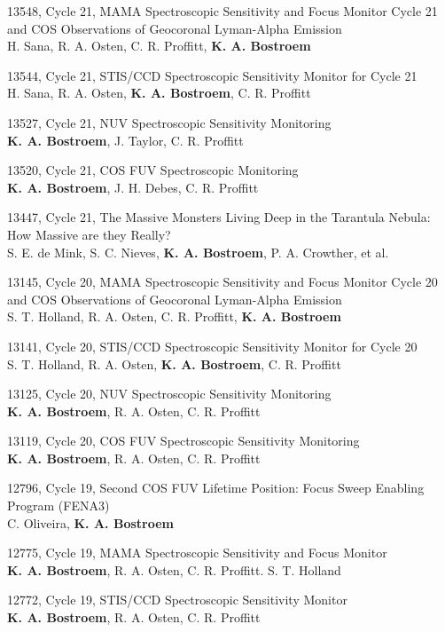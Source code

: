 \documentclass{res}
\begin{document}
\begin{resume}
13548, Cycle 21, MAMA Spectroscopic Sensitivity and Focus Monitor Cycle 21 and COS Observations of Geocoronal Lyman-Alpha Emission \\
H. Sana, R. A. Osten, C. R. Proffitt, {\bf K. A. Bostroem}

13544, Cycle 21, STIS/CCD Spectroscopic Sensitivity Monitor for Cycle 21 \\
H. Sana, R. A. Osten, {\bf K. A. Bostroem}, C. R. Proffitt

13527, Cycle 21, NUV Spectroscopic Sensitivity Monitoring \\
{\bf K. A. Bostroem}, J. Taylor, C. R. Proffitt

13520, Cycle 21, COS FUV Spectroscopic Monitoring \\
{\bf K. A. Bostroem}, J. H. Debes, C. R. Proffitt

13447, Cycle 21, The Massive Monsters Living Deep in the Tarantula Nebula: How Massive are they Really? \\
S. E. de Mink, S. C. Nieves, {\bf K. A. Bostroem}, P. A. Crowther, et al.

13145, Cycle 20, MAMA Spectroscopic Sensitivity and Focus Monitor Cycle 20 and COS Observations of Geocoronal Lyman-Alpha Emission \\
S. T. Holland, R. A. Osten, C. R. Proffitt, {\bf K. A. Bostroem}

13141, Cycle 20, STIS/CCD Spectroscopic Sensitivity Monitor for Cycle 20 \\
S. T. Holland, R. A. Osten, {\bf K. A. Bostroem}, C. R. Proffitt

13125, Cycle 20, NUV Spectroscopic Sensitivity Monitoring \\
{\bf K. A. Bostroem}, R. A. Osten, C. R. Proffitt

13119, Cycle 20, COS FUV Spectroscopic Sensitivity Monitoring \\
{\bf K. A. Bostroem}, R. A. Osten, C. R. Proffitt

12796, Cycle 19, Second COS FUV Lifetime Position: Focus Sweep Enabling Program (FENA3) \\
C. Oliveira, {\bf K. A. Bostroem}

12775, Cycle 19, MAMA Spectroscopic Sensitivity and Focus Monitor \\
{\bf K. A. Bostroem}, R. A. Osten, C. R. Proffitt. S. T. Holland

12772, Cycle 19, STIS/CCD Spectroscopic Sensitivity Monitor \\
{\bf K. A. Bostroem}, R. A. Osten, C. R. Proffitt


\end{resume}
\end{document}
